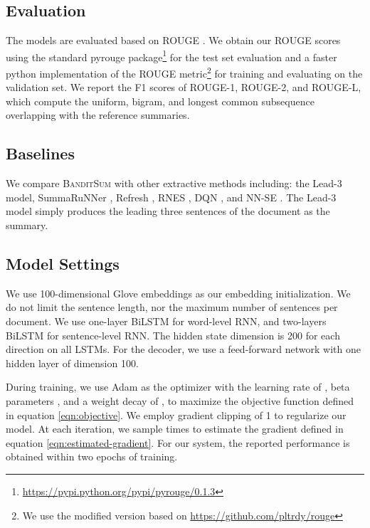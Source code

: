\documentclass[11pt,a4paper]{article}
\newcommand{\B}{\textsc{BanditSum }}
\begin{document}
\subsection{Evaluation}
The models are evaluated based on ROUGE \cite{eva1_lin:2004:ACLsummarization}.
We obtain our ROUGE scores using the standard pyrouge
package\footnote{\url{https://pypi.python.org/pypi/pyrouge/0.1.3}} for the test set evaluation and a faster python implementation of the ROUGE metric\footnote{We use the modified version based on \url{https://github.com/pltrdy/rouge}}
for training and evaluating on the validation set. We report the F1 scores of ROUGE-1, ROUGE-2, and ROUGE-L, which compute the uniform, bigram, and longest common subsequence overlapping with the reference summaries.  



\subsection{Baselines}
We compare \B with other extractive methods including: the Lead-3 model, SummaRuNNer \citep{ext5_summarunner}, Refresh \citep{DBLP:Narayan/2018}, RNES \citep{DBLP:conf/aaai/WuH18}, DQN \citep{yao2018deep}, and NN-SE \citep{ext4_cheng2016neural}.  The Lead-3 model simply produces the leading three sentences of the document as the summary. 


\subsection{Model Settings}
We use 100-dimensional Glove embeddings \citep{we2_pennington2014glove} as our embedding initialization. We do not limit the sentence length, nor the maximum number of sentences per document. We use one-layer BiLSTM for word-level RNN, and two-layers BiLSTM for sentence-level RNN. The hidden state dimension is 200 for each direction on all LSTMs. For the decoder, we use a feed-forward network with one hidden layer of  dimension 100. 


During training, we use Adam \citep{adam_kingma2014adam} as the optimizer with the learning rate of , beta parameters , and a weight decay of , to maximize the objective function defined in equation \eqref{eqn:objective}. We employ gradient clipping of 1 to regularize our model. At each iteration, we sample  times to estimate the gradient defined in equation \ref{eqn:estimated-gradient}. For our system, the reported performance is obtained within two epochs of training.
\end{document}
